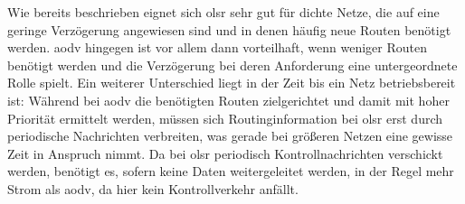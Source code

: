Wie bereits beschrieben eignet sich \gls{olsr} sehr gut für dichte Netze, die auf eine geringe Verzögerung angewiesen sind und in denen häufig neue Routen benötigt werden. \gls{aodv} hingegen ist vor allem dann vorteilhaft, wenn weniger Routen benötigt werden und die Verzögerung bei deren Anforderung eine untergeordnete Rolle spielt. Ein weiterer Unterschied liegt in der Zeit bis ein Netz betriebsbereit ist: Während bei \gls{aodv} die benötigten Routen zielgerichtet und damit mit hoher Priorität ermittelt werden, müssen sich Routinginformation bei \gls{olsr} erst durch periodische Nachrichten verbreiten, was gerade bei größeren Netzen eine gewisse Zeit in Anspruch nimmt. Da bei \gls{olsr} periodisch Kontrollnachrichten verschickt werden, benötigt es, sofern keine Daten weitergeleitet werden, in der Regel mehr Strom als \gls{aodv}, da hier kein Kontrollverkehr anfällt.
